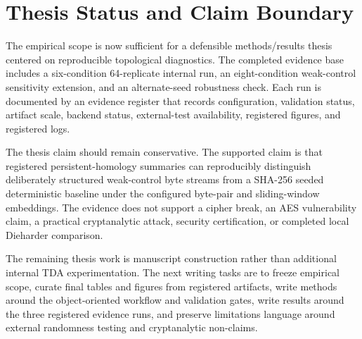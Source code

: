 
\section{Thesis Status and Claim Boundary}
\label{sec:thesis-status}

The empirical scope is now sufficient for a defensible methods/results thesis centered on reproducible topological diagnostics. The completed evidence base includes a six-condition 64-replicate internal run, an eight-condition weak-control sensitivity extension, and an alternate-seed robustness check. Each run is documented by an evidence register that records configuration, validation status, artifact scale, backend status, external-test availability, registered figures, and registered logs.

The thesis claim should remain conservative. The supported claim is that registered persistent-homology summaries can reproducibly distinguish deliberately structured weak-control byte streams from a SHA-256 seeded deterministic baseline under the configured byte-pair and sliding-window embeddings. The evidence does not support a cipher break, an AES vulnerability claim, a practical cryptanalytic attack, security certification, or completed local Dieharder comparison.

The remaining thesis work is manuscript construction rather than additional internal TDA experimentation. The next writing tasks are to freeze empirical scope, curate final tables and figures from registered artifacts, write methods around the object-oriented workflow and validation gates, write results around the three registered evidence runs, and preserve limitations language around external randomness testing and cryptanalytic non-claims.
